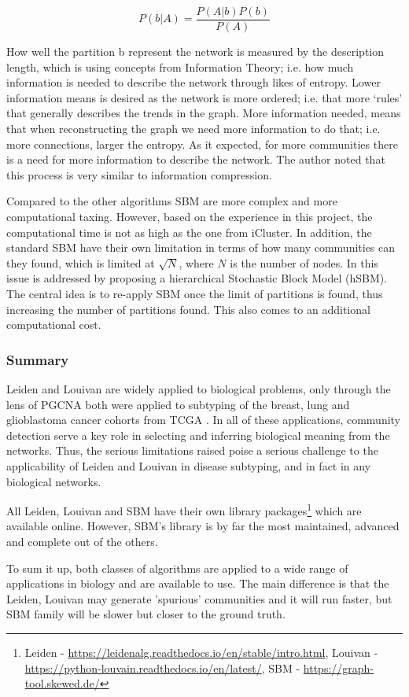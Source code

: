 \begin{equation} \label{eq:sbm}
         P(b|A) = \frac{P(A|b)P(b)}{P(A)}
\end{equation}

How well the partition b represent the network is measured by the description length, which is using concepts from Information Theory; i.e. how much information is needed to describe the network through likes of entropy. Lower information means is desired as the network is more ordered; i.e. that more ‘rules’ that generally describes the trends in the graph. More information needed, means that  when reconstructing the graph we need more information to do that; i.e. more connections, larger the entropy. As it expected, for more communities there is a need for more information to describe the network. The author noted that this process is very similar to information compression.

Compared to the other algorithms SBM are more complex and more computational taxing. However, based on the experience in this project, the computational time is not as high as the one from iCluster\citet{Mo2013-zi}. In addition, the standard SBM \citet{Peixoto2019-fg, Peixoto2017-gc, Peixoto2017-ua, Karrer2011-si} have their own limitation in terms of how many communities can they found, which is limited at $\sqrt{N}$, where $N$ is the number of nodes. In \citet{Peixoto2014-yb} this issue is addressed by proposing a hierarchical Stochastic Block Model (hSBM). The central idea is to re-apply SBM once the limit of partitions is found, thus increasing the number of partitions found. This also comes to an additional computational cost.

\subsubsection{Summary}


Leiden and Louivan are widely applied to biological problems, only through the lens of PGCNA both were applied to subtyping of the breast, lung and glioblastoma cancer cohorts from TCGA \cite{Tanner2023-wa, Care2019-ij}. In all of these applications, community detection serve a key role in selecting and inferring biological meaning from the networks. Thus, the serious limitations raised \citet{Peixoto2021-jx,Guimera2004-gv, Peixoto2023-rt} poise a serious challenge to the applicability of Leiden and Louivan in disease subtyping, and in fact in any biological networks. 


All Leiden, Louivan and SBM have their own library packages\footnote{Leiden - \url{https://leidenalg.readthedocs.io/en/stable/intro.html}, Louivan - \url{https://python-louvain.readthedocs.io/en/latest/}, SBM - \url{https://graph-tool.skewed.de/}} which are available online. However, SBM's library is by far the most maintained, advanced and complete out of the others. 

To sum it up, both classes of algorithms are applied to a wide range of applications in biology and are available to use. The main difference is that the Leiden, Louivan may generate 'spurious' communities and it will run faster, but SBM family will be slower but closer to the ground truth.




